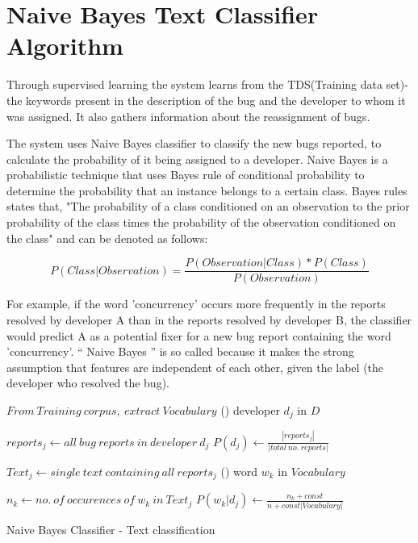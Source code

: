 \section{Naive Bayes Text Classifier Algorithm}
Through supervised learning the system learns from the TDS(Training data set)- the keywords present in the description of the bug and the developer to whom it was assigned. It also gathers information about the reassignment of bugs.

The system uses Naive Bayes classifier to classify the new bugs reported, to calculate the probability of it being assigned to a developer. Naive Bayes is a probabilistic technique that uses Bayes rule of conditional probability to determine the probability that an instance belongs to a certain class. Bayes rules states that, "The probability of a class conditioned on an observation to the prior probability of the class times the probability of the observation conditioned on the class" and can be denoted as follows:

\[{P(Class|Observation)} = {\frac{P(Observation|Class)*P(Class)}{P(Observation)}}\]

For example, if the word 'concurrency' occurs more frequently in the reports resolved by developer A than in the reports resolved by developer B, the classifier would predict A as a potential fixer for a new bug report containing the word 'concurrency'. “ Naive Bayes ” is so called because it makes the strong assumption that features are independent of each other, given the label (the developer who resolved the bug).

\begin{algorithm}[H]
	\DontPrintSemicolon %
	$From\ Training\ corpus,\ extract\ Vocabulary$ \;
	\ForEach(){ developer $d_j$ in $D$} { 
		$reports_j \gets {all\ bug\ reports\ in\ developer\ d_j}$ \;
		$P(d_j) \gets {\frac{|reports_j|}{|total\ no.\ reports|}}$ \;
	
	}
	$Text_j \gets {single\ text\ containing\ all\ reports_j}$ \;
\ForEach(){ word $w_k$ in $Vocabulary$} { 
		$n_k \gets {no.\ of\ occurences\ of\ w_k\ in\ Text_j}$ \;
		$P(w_k |d_j) \gets {\frac{n_k+const}{n+const|Vocabulary|}}$ \;
		
	
	}	
	
	\;
	\caption{{\sc Naive Bayes Classifier} - Text classification}
	\label{algo:Naive Bayes}
\end{algorithm}

